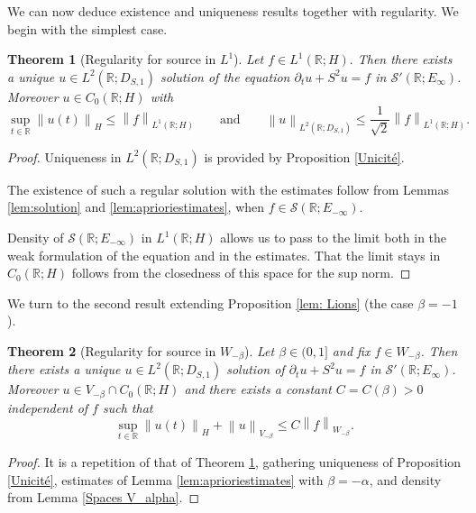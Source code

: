 \documentclass[11pt, letterpaper]{amsart}
\newtheorem{thm}{Theorem}[section]
\theoremstyle{definition}
\theoremstyle{remark}
\numberwithin{equation}{section}
\begin{document}
We can now deduce existence and uniqueness results together with regularity.
We begin with the simplest case.
\begin{thm}[Regularity for source in $L^1$]\label{Régula Cas L1}
    Let $f \in L^1(\mathbb{R};H).$ Then there exists a unique $u \in L^2(\mathbb{R};D_{S,1})$ solution of the equation $\partial_t u +S^2 u =f$ in $\mathcal{S'}(\mathbb{R}; E_\infty)$. Moreover $u \in C_0(\mathbb{R}; H)$ with 
    \begin{equation*}
        \sup_{t \in \mathbb{R}} \left\| u(t)\right\|_H  \leq  \left\|f \right\|_{L^1(\mathbb{R};H) } \qquad \mathrm{and} \qquad \left\|u \right\|_{L^2(\mathbb{R}; D_{S,1})} \leq \frac{1}{\sqrt{2}} \left\|f \right\|_{L^1(\mathbb{R};H) } .
    \end{equation*}
\end{thm}
\begin{proof}
Uniqueness in $L^2(\mathbb{R};D_{S,1})$ is provided by Proposition \ref{Unicité}.

The existence of such a regular solution with the estimates follow from Lemmas \ref{lem:solution} and \ref{lem:aprioriestimates}, when $f\in \mathcal{S}(\mathbb{R}; E_{-\infty}) $.

Density of $\mathcal{S}(\mathbb{R}; E_{-\infty})$ in $L^1(\mathbb{R};H)$ allows us to pass to the limit both in the weak formulation of the equation and in the estimates. That the limit stays in $C_0(\mathbb{R}; H)$  follows from the closedness of this space for the sup norm.
\end{proof}


We turn to the second result extending Proposition \ref{lem: Lions} (the case $\beta=-1$).

\begin{thm}[Regularity for source in $W_{-\beta}$]\label{cas Etheta}
    Let $\beta \in (0,1]$ and fix $f \in  W_{-\beta}$. Then there exists a unique $u \in L^2(\mathbb{R};D_{S,1})$ solution of $\partial_t u +S^2 u =f$ in $\mathcal{S'}(\mathbb{R}; E_\infty)$. Moreover $u \in V_{-\beta} \cap C_0(\mathbb{R}; H)$ and there exists a constant $C=C(\beta)>0$ independent of $f$ such that 
    \begin{equation*}
        \sup_{t \in \mathbb{R}} \left\| u(t)\right\|_H + \left\|u \right\|_{V_{-\beta}} \leq C \left\|f \right\|_{ W_{-\beta}}.
    \end{equation*}
\end{thm}
\begin{proof}
It is a repetition of that of Theorem \ref{Régula Cas L1}, gathering uniqueness of Proposition \ref{Unicité}, estimates of Lemma \ref{lem:aprioriestimates} with $\beta=-\alpha$, and density from Lemma \ref{Spaces V_alpha}.
\end{proof}
\end{document}

